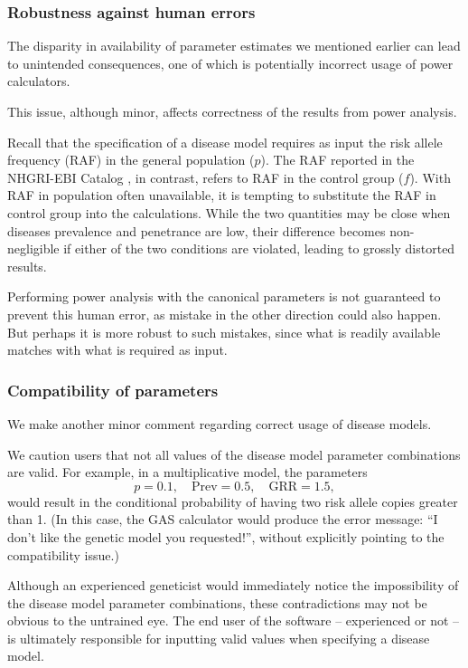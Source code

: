 \subsubsection{Robustness against human errors}

The disparity in availability of parameter estimates we mentioned earlier can lead to unintended consequences, one of which is potentially incorrect usage of power calculators.

This issue, although minor, affects correctness of the results from power analysis.

Recall that the specification of a disease model requires as input the risk allele frequency (RAF) in the general population ($p$).
The RAF reported in the NHGRI-EBI Catalog \citep{MacArthur16}, in contrast, refers to RAF in the control group ($f$).
With RAF in population often unavailable, it is tempting to substitute the RAF in control group into the calculations.
While the two quantities may be close when diseases prevalence and penetrance are low, their difference becomes non-negligible if either of the two conditions are violated, leading to grossly distorted results.

Performing power analysis with the canonical parameters is not guaranteed to prevent this human error, as mistake in the other direction could also happen.
But perhaps it is more robust to such mistakes, since what is readily available matches with what is required as input.

\subsubsection{Compatibility of parameters}

We make another minor comment regarding correct usage of disease models.

We caution users that not all values of the disease model parameter combinations are valid.
For example, in a multiplicative model, the parameters 
\begin{equation*}
    p = 0.1, \quad \text{Prev} = 0.5, \quad \text{GRR} = 1.5,
\end{equation*}
would result in the conditional probability of having two risk allele copies greater than 1.
(In this case, the GAS calculator \citep{Johnson17} would produce the error message: ``I don't like the genetic model you requested!'', without explicitly pointing to the compatibility issue.)

Although an experienced geneticist would immediately notice the impossibility of the disease model parameter combinations, these contradictions may not be obvious to the untrained eye.
The end user of the software -- experienced or not -- is ultimately responsible for inputting valid values when specifying a disease model.


